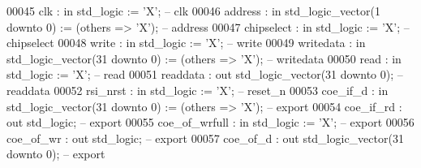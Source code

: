 \begin{DoxyCode}
00045             clk            : \textcolor{keywordflow}{in}  \textcolor{comment}{std\_logic}                     := 'X';             \textcolor{keyword}{-- clk}
00046             address        : \textcolor{keywordflow}{in}  \textcolor{comment}{std\_logic\_vector}(\textcolor{vhdllogic}{}\textcolor{vhdllogic}{1} \textcolor{keywordflow}{downto} \textcolor{vhdllogic}{}\textcolor{vhdllogic}{0})  := (\textcolor{keywordflow}{others} => 'X'); \textcolor{keyword}{-- address}
00047             chipselect     : \textcolor{keywordflow}{in}  \textcolor{comment}{std\_logic}                     := 'X';             \textcolor{keyword}{-- chipselect}
00048             write          : \textcolor{keywordflow}{in}  \textcolor{comment}{std\_logic}                     := 'X';             \textcolor{keyword}{-- write}
00049             writedata      : \textcolor{keywordflow}{in}  \textcolor{comment}{std\_logic\_vector}(\textcolor{vhdllogic}{}\textcolor{vhdllogic}{31} \textcolor{keywordflow}{downto} \textcolor{vhdllogic}{}\textcolor{vhdllogic}{0}) := (\textcolor{keywordflow}{others} => 'X'); \textcolor{keyword}{-- writedata}
00050             read           : \textcolor{keywordflow}{in}  \textcolor{comment}{std\_logic}                     := 'X';             \textcolor{keyword}{-- read}
00051             readdata       : \textcolor{keywordflow}{out} \textcolor{comment}{std\_logic\_vector}(\textcolor{vhdllogic}{}\textcolor{vhdllogic}{31} \textcolor{keywordflow}{downto} \textcolor{vhdllogic}{}\textcolor{vhdllogic}{0});                    \textcolor{keyword}{-- readdata}
00052             rsi_nrst       : \textcolor{keywordflow}{in}  \textcolor{comment}{std\_logic}                     := 'X';             \textcolor{keyword}{-- reset\_n}
00053             coe_if_d       : \textcolor{keywordflow}{in}  \textcolor{comment}{std\_logic\_vector}(\textcolor{vhdllogic}{}\textcolor{vhdllogic}{31} \textcolor{keywordflow}{downto} \textcolor{vhdllogic}{}\textcolor{vhdllogic}{0}) := (\textcolor{keywordflow}{others} => 'X'); \textcolor{keyword}{-- export}
00054             coe_if_rd      : \textcolor{keywordflow}{out} \textcolor{comment}{std\_logic};                                        \textcolor{keyword}{-- export}
00055             coe_of_wrfull  : \textcolor{keywordflow}{in}  \textcolor{comment}{std\_logic}                     := 'X';             \textcolor{keyword}{-- export}
00056             coe_of_wr      : \textcolor{keywordflow}{out} \textcolor{comment}{std\_logic};                                        \textcolor{keyword}{-- export}
00057             coe_of_d       : \textcolor{keywordflow}{out} \textcolor{comment}{std\_logic\_vector}(\textcolor{vhdllogic}{}\textcolor{vhdllogic}{31} \textcolor{keywordflow}{downto} \textcolor{vhdllogic}{}\textcolor{vhdllogic}{0});                    \textcolor{keyword}{-- export}

\end{DoxyCode}
